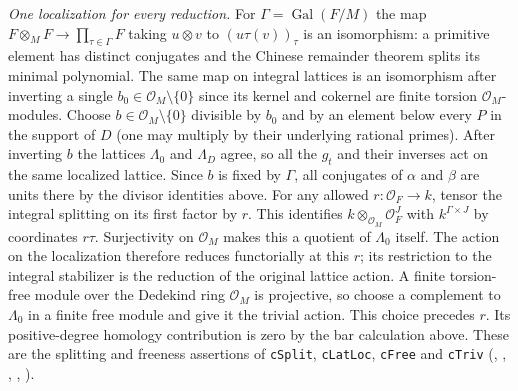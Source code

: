 \emph{One localization for every reduction.} For
$\Gamma=\operatorname{Gal}(F/M)$ the map
$F\otimes_M F\to\prod_{\tau\in\Gamma}F$ taking
$u\otimes v$ to $(u\tau(v))_\tau$ is an isomorphism: a primitive
element has distinct conjugates and the Chinese remainder theorem
splits its minimal polynomial. The same map on integral lattices is
an isomorphism after inverting a single $b_0\in\mathcal O_M\setminus\{0\}$
since its kernel and cokernel are finite torsion $\mathcal O_M$-modules.
Choose $b\in\mathcal O_M\setminus\{0\}$ divisible by $b_0$ and by
an element below every $P$ in the support of $D$ (one may multiply
by their underlying rational primes). After inverting $b$ the lattices
$\Lambda_0$ and $\Lambda_D$ agree, so all the $g_t$ and their inverses
act on the same localized lattice. Since $b$ is fixed by $\Gamma$,
all conjugates of $\alpha$ and $\beta$ are units there by the divisor
identities above. For any allowed $r:\mathcal O_F\to k$, tensor the
integral splitting on its first factor by $r$. This identifies
$k\otimes_{\mathcal O_M}\mathcal O_F^J$ with $k^{\Gamma\times J}$
by coordinates $r\tau$. Surjectivity on $\mathcal O_M$ makes this a
quotient of $\Lambda_0$ itself. The action on the localization
therefore reduces functorially at this $r$; its restriction to the
integral stabilizer is the reduction of the original lattice action.
A finite torsion-free module over the Dedekind ring $\mathcal O_M$ is
projective, so choose a complement to $\Lambda_0$ in a finite free
module and give it the trivial action. This choice precedes $r$. Its
positive-degree homology contribution is zero by the bar calculation
above. These are the splitting and freeness assertions of
\nolinkurl{cSplit}, \nolinkurl{cLatLoc}, \nolinkurl{cFree} and
\nolinkurl{cTriv} (,
,
,
,
).

